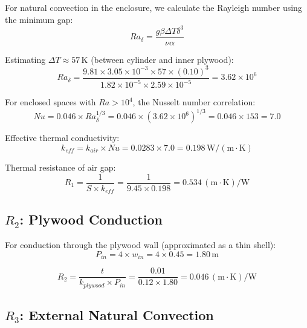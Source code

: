 \documentclass[11pt]{article}
\newcommand{\unit}[1]{\,\mathrm{#1}}
\begin{document}
For natural convection in the enclosure, we calculate the Rayleigh number using the minimum gap:
\begin{equation}
    Ra_\delta = \frac{g\beta\Delta T \delta^3}{\nu\alpha}
\end{equation}

Estimating $\Delta T \approx 57\unit{K}$ (between cylinder and inner plywood):
\begin{equation}
    Ra_\delta = \frac{9.81 \times 3.05 \times 10^{-3} \times 57 \times (0.10)^3}{1.82 \times 10^{-5} \times 2.59 \times 10^{-5}} = \boxed{3.62 \times 10^6}
\end{equation}

For enclosed spaces with $Ra > 10^4$, the Nusselt number correlation:
\begin{equation}
    Nu = 0.046 \times Ra_\delta^{1/3} = 0.046 \times (3.62 \times 10^6)^{1/3} = 0.046 \times 153 = \boxed{7.0}
\end{equation}

Effective thermal conductivity:
\begin{equation}
    k_{eff} = k_{air} \times Nu = 0.0283 \times 7.0 = 0.198\unit{W/(m \cdot K)}
\end{equation}

Thermal resistance of air gap:
\begin{equation}
    R_1 = \frac{1}{S \times k_{eff}} = \frac{1}{9.45 \times 0.198} = \boxed{0.534\unit{(m \cdot K)/W}}
\end{equation}

\subsection{$R_2$: Plywood Conduction}

For conduction through the plywood wall (approximated as a thin shell):
\begin{equation}
    P_{in} = 4 \times w_{in} = 4 \times 0.45 = 1.80\unit{m}
\end{equation}

\begin{equation}
    R_2 = \frac{t}{k_{plywood} \times P_{in}} = \frac{0.01}{0.12 \times 1.80} = \boxed{0.046\unit{(m \cdot K)/W}}
\end{equation}

\subsection{$R_3$: External Natural Convection}
\end{document}
